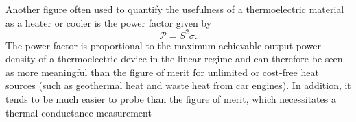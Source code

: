 Another figure often used to quantify the usefulness of a thermoelectric material as
a heater or cooler is the power factor given by
$$
    \mathcal{P}=S^{2} \sigma .
$$
The power factor is proportional to the maximum achievable output power density of a thermoelectric device in the linear regime and can therefore be seen as more meaningful than the figure of merit for unlimited or cost-free heat sources (such as geothermal heat and waste heat from car engines). In addition, it tends to be much easier to probe than the figure of merit, which necessitates a thermal conductance measurement